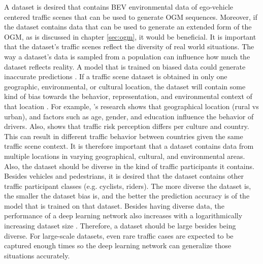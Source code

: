 A dataset is desired that contains \gls{BEV} environmental data of ego-vehicle centered traffic scenes that can be used to generate \gls{OGM} sequences. Moreover, if the dataset contains data that can be used to generate an extended form of the \gls{OGM}, as is discussed in chapter \ref{sec:ogm}, it would be beneficial.
It is important that the dataset's traffic scenes reflect the diversity of real world situations. The way a dataset's data is sampled from a population can influence how much the dataset reflects reality. A model that is trained on biased data could generate inaccurate predictions \cite{mehrabi2019survey}. If a traffic scene dataset is obtained in only one geographic, environmental, or cultural location, the dataset will contain some kind of bias towards the behavior, representation, and environmental context of that location \cite{mehrabi2019survey}. For example, \cite{nordfjaern2010investigation}'s research shows that geographical location (rural vs urban), and factors such as age, gender, and education influence the behavior of drivers. Also, \cite{nordfjaern2014culture} shows that traffic risk perception differs per culture and country. This can result in different traffic behavior between countries given the same traffic scene context. It is therefore important that a dataset contains data from multiple locations in varying geographical, cultural, and environmental areas. Also, the dataset should be diverse in the kind of traffic participants it contains. Besides vehicles and pedestrians, it is desired that the dataset contains other traffic participant classes (e.g. cyclists, riders). The more diverse the dataset is, the smaller the dataset bias is, and the better the prediction accuracy is of the model that is trained on that dataset. Besides having diverse data, the performance of a deep learning network also increases with a logarithmically increasing dataset size \cite{torralba2011unbiased}. Therefore, a dataset should be large besides being diverse. For large-scale datasets, even rare traffic cases are expected to be captured enough times so the deep learning network can generalize those situations accurately. \\

